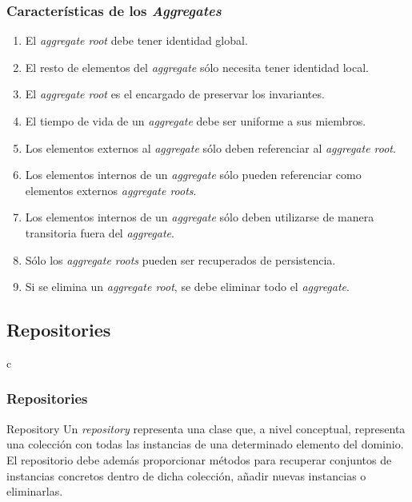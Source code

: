 \documentclass[a4paper,slidestop,xcolor=pst,dvips,blue]{beamer}
\begin{document}
\begin{frame}[c]
    \frametitle{Características de los \emph{Aggregates}}
    \begin{enumerate}[<+->]
        \item El \emph{aggregate root} debe tener identidad global.
        \item El resto de elementos del \emph{aggregate} sólo necesita tener identidad local.
        \item El \emph{aggregate root} es el encargado de preservar los invariantes.
        \item El tiempo de vida de un \emph{aggregate} debe ser uniforme a sus miembros.
        \item Los elementos externos al \emph{aggregate} sólo deben referenciar al \emph{aggregate root}.
        \item Los elementos internos de un \emph{aggregate} sólo pueden referenciar como elementos externos \emph{aggregate roots}.
        \item Los elementos internos de un \emph{aggregate} sólo deben utilizarse de manera transitoria fuera del \emph{aggregate}.
        \item Sólo los \emph{aggregate roots} pueden ser recuperados de persistencia.
        \item Si se elimina un \emph{aggregate root}, se debe eliminar todo el \emph{aggregate}. 
    \end{enumerate}
\end{frame}

\subsection{Repositories}

\begin{frame}{c}
    \frametitle{Repositories}
    \begin{block}{Repository}
        Un \emph{repository} representa una clase que, a nivel conceptual, representa una colección con todas las instancias de una determinado elemento del dominio. El repositorio debe además proporcionar métodos para recuperar conjuntos de instancias concretos dentro de dicha colección, añadir nuevas instancias o eliminarlas.
    \end{block}
\end{frame}
\end{document}
